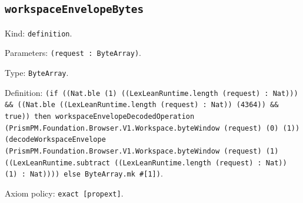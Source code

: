 \documentclass[11pt]{article}
\begin{document}
\subsection*{\texttt{workspaceEnvelopeBytes}}
\noindent Kind: \texttt{definition}.\par
\noindent Parameters: \texttt{(request : ByteArray)}.\par
\noindent Type: \texttt{ByteArray}.\par
\noindent Definition: \texttt{(if ((Nat.ble (1) ((LexLeanRuntime.length (request) : Nat))) \&\& ((Nat.ble ((LexLeanRuntime.length (request) : Nat)) (4364)) \&\& true)) then workspaceEnvelopeDecodedOperation (PrismPM.Foundation.Browser.V1.Workspace.byteWindow (request) (0) (1)) (decodeWorkspaceEnvelope (PrismPM.Foundation.Browser.V1.Workspace.byteWindow (request) (1) ((LexLeanRuntime.subtract ((LexLeanRuntime.length (request) : Nat)) (1) : Nat)))) else ByteArray.mk \#[1])}.\par
\noindent Axiom policy: \texttt{exact [propext]}.\par
\end{document}
